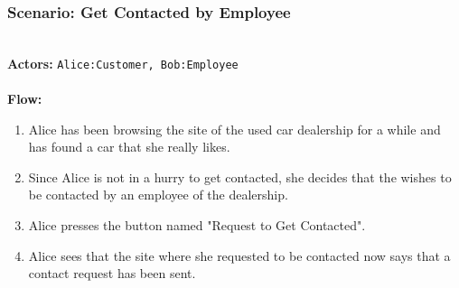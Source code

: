 \subsubsection{Scenario: Get Contacted by Employee}
\label{sec:scenario-getcontacted}
\HRule \\[0.4cm]
\textbf{Actors:} \texttt{Alice:Customer, Bob:Employee}\\
\HRule \\[0.4cm]
\textbf{Flow:} \\
\begin{enumerate}
    \item Alice has been browsing the site of the used car dealership for a while and has found a car that she really likes.
    \item Since Alice is not in a hurry to get contacted, she decides that the wishes to be contacted by an employee of the dealership. 
    \item Alice presses the button named "Request to Get Contacted".
    \item Alice sees that the site where she requested to be contacted now says that a contact request has been sent.
\end{enumerate}
\HRule \\[0.4cm]
